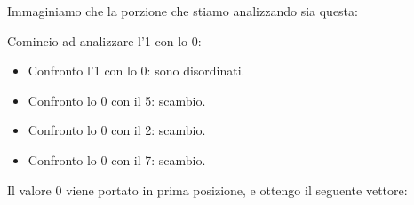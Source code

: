 \begin{esempio}
Immaginiamo che la porzione che stiamo analizzando sia questa:
\begin{center}
\end{center}

Comincio ad analizzare l'1 con lo 0:
\begin{itemize}
    \item Confronto l'1 con lo 0: sono disordinati.
    \begin{center}
    \end{center}
    \item Confronto lo 0 con il 5: scambio.
    \item Confronto lo 0 con il 2: scambio.
    \item Confronto lo 0 con il 7: scambio.
\end{itemize}

Il valore 0 viene portato in prima posizione, e ottengo il seguente vettore:
\begin{center}
\end{center}
\end{esempio}


